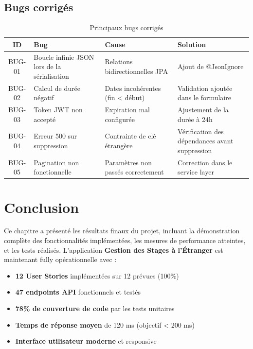 \documentclass[12pt,a4paper]{report}
\begin{document}
\subsection{Bugs corrigés}

\begin{table}[H]
\centering
\renewcommand{\arraystretch}{1.4}
\begin{tabular}{|c|p{5cm}|p{3cm}|p{3cm}|}
\hline
\textbf{ID} & \textbf{Bug} & \textbf{Cause} & \textbf{Solution} \\
\hline
BUG-01 & Boucle infinie JSON lors de la sérialisation & Relations bidirectionnelles JPA & Ajout de @JsonIgnore \\
\hline
BUG-02 & Calcul de durée négatif & Dates incohérentes (fin < début) & Validation ajoutée dans le formulaire \\
\hline
BUG-03 & Token JWT non accepté & Expiration mal configurée & Ajustement de la durée à 24h \\
\hline
BUG-04 & Erreur 500 sur suppression & Contrainte de clé étrangère & Vérification des dépendances avant suppression \\
\hline
BUG-05 & Pagination non fonctionnelle & Paramètres non passés correctement & Correction dans le service layer \\
\hline
\end{tabular}
\caption{Principaux bugs corrigés}
\end{table}

\section*{Conclusion}

Ce chapitre a présenté les résultats finaux du projet, incluant la démonstration complète des fonctionnalités implémentées, les mesures de performance atteintes, et les tests réalisés. L'application \textbf{Gestion des Stages à l'Étranger} est maintenant fully opérationnelle avec :

\begin{itemize}[leftmargin=1cm]
    \item \textbf{12 User Stories} implémentées sur 12 prévues (100\%)
    \item \textbf{47 endpoints API} fonctionnels et testés
    \item \textbf{78\% de couverture de code} par les tests unitaires
    \item \textbf{Temps de réponse moyen} de 120 ms (objectif < 200 ms)
    \item \textbf{Interface utilisateur moderne} et responsive
\end{itemize}
\end{document}
